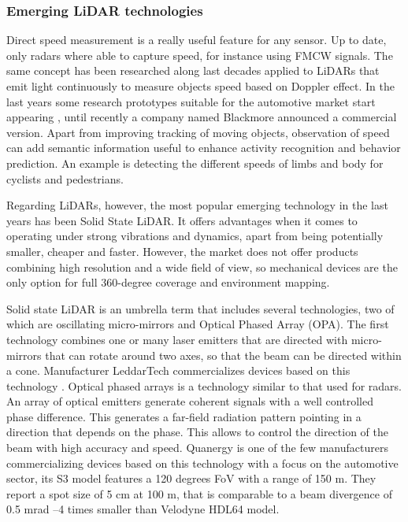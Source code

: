 \subsubsection{Emerging LiDAR technologies}
\label{sec:03-lidar-emerging}

Direct speed measurement is a really useful feature for any sensor. Up to date,
only radars where able to capture speed, for instance using FMCW signals.
The same concept has been researched along last decades \cite{Nordin2004}
applied to LiDARs that emit light continuously to measure objects speed based 
on Doppler effect. In the last years some research prototypes suitable for
the automotive market start appearing \cite{Poulton2016}, until recently
a company named Blackmore announced a commercial version. 
Apart from improving tracking of moving objects, observation of speed can
add semantic information useful to enhance activity recognition and behavior
prediction. An example is detecting the different speeds of limbs and body for
cyclists and pedestrians.

Regarding LiDARs, however, the most popular emerging technology in the last 
years has been Solid State LiDAR. It offers advantages when it comes
to operating under strong vibrations and dynamics, apart from being potentially
smaller, cheaper and faster. 
However, the market does not offer products combining high resolution and a 
wide field of view, so mechanical devices are the only option for full 
360-degree coverage and environment mapping.

Solid state LiDAR is an umbrella term that includes several technologies, two 
of which are oscillating micro-mirrors and Optical Phased Array (OPA).
The first technology combines one or many laser emitters that are directed
with micro-mirrors that can rotate around two axes, so that the beam 
can be directed within a cone. Manufacturer LeddarTech commercializes devices
based on this technology \cite{LeddarTech2016}.
Optical phased arrays \cite{McManamon1996} is a technology similar to that used 
for radars. An array of optical emitters generate coherent signals with a well
controlled phase difference. This generates a far-field radiation pattern 
pointing in a direction that depends on the phase. This allows to control the 
direction of the beam with high accuracy and speed. Quanergy \cite{Eldada2017} 
is one of the few manufacturers commercializing devices based on this technology
with a focus on the automotive sector, its S3 model features a 120 degrees FoV
with a range of 150 m. They report a spot size of 5 cm at 100 m, that is 
comparable to a beam divergence of 0.5 mrad --4 times smaller than Velodyne 
HDL64 model.

